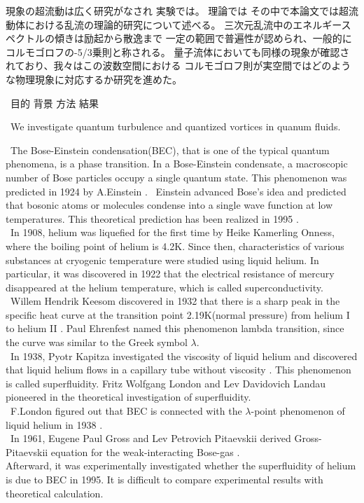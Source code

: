 \documentclass[12pt,a4paper]{jbook}
\begin{document}
現象の超流動は広く研究がなされ
実験では。
理論では
その中で本論文では超流動体における乱流の理論的研究について述べる。
三次元乱流中のエネルギースペクトルの傾きは励起から散逸まで
一定の範囲で普遍性が認められ、一般的にコルモゴロフの-5/3乗則と称される。
量子流体においても同様の現象が確認されており、我々はこの波数空間における
コルモゴロフ則が実空間ではどのような物理現象に対応するか研究を進めた。

\ 目的
背景
方法
結果

\ We investigate quantum turbulence and quantized vortices in quanum fluids.


\ The Bose-Einstein condensation(BEC), that is one of the typical quantum phenomena,
is a phase transition.
In a Bose-Einstein condensate, a macroscopic number of
Bose particles occupy a single quantum state.
This phenomenon was predicted in 1924 by A.Einstein \cite{1} \cite{2}.
\ Einstein advanced Bose's idea and predicted that bosonic atoms or molecules
condense into a single wave function at low temperatures.
This theoretical prediction has been realized in 1995 \cite{3} \cite{4}.
\\
\ In 1908, helium was liquefied for the first time by Heike Kamerling Onness,
where the boiling point of helium is 4.2K.
Since then, characteristics of various substances at cryogenic temperature
were studied using liquid helium.
In particular, it was discovered in 1922 that the electrical resistance of mercury
disappeared at the helium temperature, which is called superconductivity.
\\
\ Willem Hendrik Keesom discovered in 1932 that there is a sharp peak
in the specific heat curve at the transition point 2.19K(normal pressure)
from helium I to helium II \cite{5}. Paul Ehrenfest named this phenomenon lambda transition,
since the curve was similar to the Greek symbol $\lambda$.
\\
\ In 1938, Pyotr Kapitza investigated the viscosity of liquid helium and
discovered that liquid helium flows in a capillary tube without viscosity \cite{6}.
This phenomenon is called superfluidity. Fritz Wolfgang London and Lev Davidovich Landau pioneered
in the theoretical investigation of superfluidity.
\\
\ F.London figured out that BEC is connected with
the $\lambda$-point phenomenon of liquid helium in 1938 \cite{7}.
\\
\ In 1961, Eugene Paul Gross and Lev Petrovich Pitaevskii derived Gross-Pitaevskii equation for the weak-interacting Bose-gas
\cite{8} \cite{9}.
\\ Afterward, it was experimentally investigated whether the superfluidity of helium is due to BEC in 1995\cite{10}\cite{11}\cite{12}.
It is difficult to compare experimental results with theoretical calculation.
\end{document}
